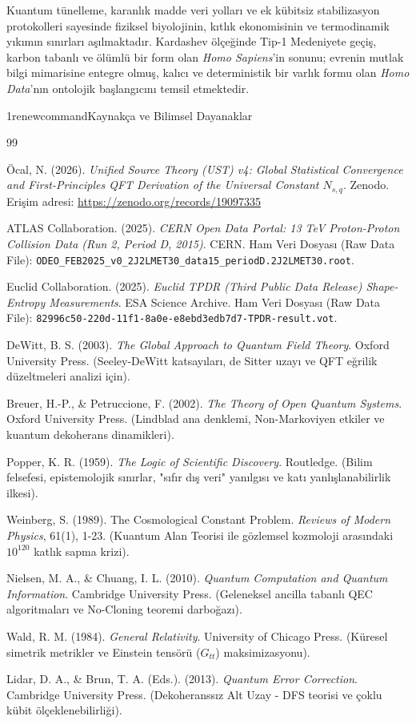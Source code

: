 \documentclass[12pt,a4paper]{article}
\begin{document}
Kuantum tünelleme, karanlık madde veri yolları ve ek kübitsiz stabilizasyon protokolleri sayesinde fiziksel biyolojinin, kıtlık ekonomisinin ve termodinamik yıkımın sınırları aşılmaktadır. Kardashev ölçeğinde Tip-1 Medeniyete geçiş, karbon tabanlı ve ölümlü bir form olan \textit{Homo Sapiens}'in sonunu; evrenin mutlak bilgi mimarisine entegre olmuş, kalıcı ve deterministik bir varlık formu olan \textit{Homo Data}'nın ontolojik başlangıcını temsil etmektedir.



1renewcommand{\refname}{Kaynakça ve Bilimsel Dayanaklar}
\begin{thebibliography}{99}

Öcal, N. (2026). \textit{Unified Source Theory (UST) v4: Global Statistical Convergence and First-Principles QFT Derivation of the Universal Constant $N_{s,q}$}. Zenodo. Erişim adresi: \url{https://zenodo.org/records/19097335}

ATLAS Collaboration. (2025). \textit{CERN Open Data Portal: 13 TeV Proton-Proton Collision Data (Run 2, Period D, 2015)}. CERN. Ham Veri Dosyası (Raw Data File): \texttt{ODEO\_FEB2025\_v0\_2J2LMET30\_data15\_periodD.2J2LMET30.root}.

Euclid Collaboration. (2025). \textit{Euclid TPDR (Third Public Data Release) Shape-Entropy Measurements}. ESA Science Archive. Ham Veri Dosyası (Raw Data File): \texttt{82996c50-220d-11f1-8a0e-e8ebd3edb7d7-TPDR-result.vot}.

DeWitt, B. S. (2003). \textit{The Global Approach to Quantum Field Theory}. Oxford University Press. (Seeley-DeWitt katsayıları, de Sitter uzayı ve QFT eğrilik düzeltmeleri analizi için).

Breuer, H.-P., \& Petruccione, F. (2002). \textit{The Theory of Open Quantum Systems}. Oxford University Press. (Lindblad ana denklemi, Non-Markoviyen etkiler ve kuantum dekoherans dinamikleri).

Popper, K. R. (1959). \textit{The Logic of Scientific Discovery}. Routledge. (Bilim felsefesi, epistemolojik sınırlar, "sıfır dış veri" yanılgısı ve katı yanlışlanabilirlik ilkesi).

Weinberg, S. (1989). The Cosmological Constant Problem. \textit{Reviews of Modern Physics}, 61(1), 1-23. (Kuantum Alan Teorisi ile gözlemsel kozmoloji arasındaki $10^{120}$ katlık sapma krizi).

Nielsen, M. A., \& Chuang, I. L. (2010). \textit{Quantum Computation and Quantum Information}. Cambridge University Press. (Geleneksel ancilla tabanlı QEC algoritmaları ve No-Cloning teoremi darboğazı).

Wald, R. M. (1984). \textit{General Relativity}. University of Chicago Press. (Küresel simetrik metrikler ve Einstein tensörü ($G_{tt}$) maksimizasyonu).

Lidar, D. A., \& Brun, T. A. (Eds.). (2013). \textit{Quantum Error Correction}. Cambridge University Press. (Dekoheranssız Alt Uzay - DFS teorisi ve çoklu kübit ölçeklenebilirliği).

\end{thebibliography}
\end{document}
